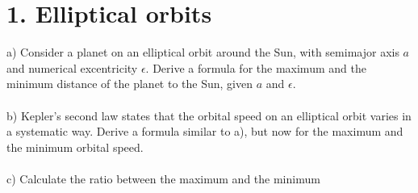 \section*{1. Elliptical orbits}

a) Consider a planet on an elliptical orbit around the Sun, with semimajor axis $a$ and numerical 
excentricity $\epsilon$. Derive a formula for the maximum and the minimum distance of the planet to the
Sun, given $a$ and $\epsilon$.\\
\\
b) Kepler's second law states that the orbital speed on an elliptical orbit varies in a systematic way.
Derive a formula similar to a), but now for the maximum and the minimum orbital speed.\\
\\
c) Calculate the ratio between the maximum and the minimum 
